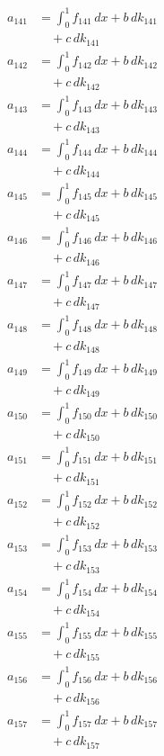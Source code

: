 \documentclass{article}
\begin{document}
\begin{align}
a_{141} &= \int_0^1 f_{141}\,dx + b\,dk_{141} \\
&\quad + c\,dk_{141} \\
a_{142} &= \int_0^1 f_{142}\,dx + b\,dk_{142} \\
&\quad + c\,dk_{142} \\
a_{143} &= \int_0^1 f_{143}\,dx + b\,dk_{143} \\
&\quad + c\,dk_{143} \\
a_{144} &= \int_0^1 f_{144}\,dx + b\,dk_{144} \\
&\quad + c\,dk_{144} \\
a_{145} &= \int_0^1 f_{145}\,dx + b\,dk_{145} \\
&\quad + c\,dk_{145} \\
a_{146} &= \int_0^1 f_{146}\,dx + b\,dk_{146} \\
&\quad + c\,dk_{146} \\
a_{147} &= \int_0^1 f_{147}\,dx + b\,dk_{147} \\
&\quad + c\,dk_{147} \\
a_{148} &= \int_0^1 f_{148}\,dx + b\,dk_{148} \\
&\quad + c\,dk_{148} \\
a_{149} &= \int_0^1 f_{149}\,dx + b\,dk_{149} \\
&\quad + c\,dk_{149} \\
a_{150} &= \int_0^1 f_{150}\,dx + b\,dk_{150} \\
&\quad + c\,dk_{150} \\
a_{151} &= \int_0^1 f_{151}\,dx + b\,dk_{151} \\
&\quad + c\,dk_{151} \\
a_{152} &= \int_0^1 f_{152}\,dx + b\,dk_{152} \\
&\quad + c\,dk_{152} \\
a_{153} &= \int_0^1 f_{153}\,dx + b\,dk_{153} \\
&\quad + c\,dk_{153} \\
a_{154} &= \int_0^1 f_{154}\,dx + b\,dk_{154} \\
&\quad + c\,dk_{154} \\
a_{155} &= \int_0^1 f_{155}\,dx + b\,dk_{155} \\
&\quad + c\,dk_{155} \\
a_{156} &= \int_0^1 f_{156}\,dx + b\,dk_{156} \\
&\quad + c\,dk_{156} \\
a_{157} &= \int_0^1 f_{157}\,dx + b\,dk_{157} \\
&\quad + c\,dk_{157} \\

\end{align}
\end{document}
